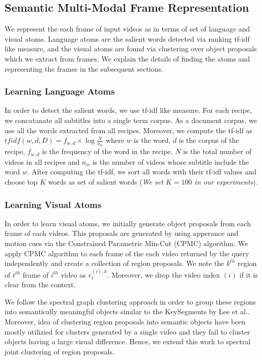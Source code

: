 \subsection{Semantic Multi-Modal Frame Representation}
We represent the each frame of input videos as in terms of set of language and visual atoms. Language atoms are the salient words detected via ranking tf-idf like measure, and the visual atoms are found via clustering over object proposals which we extract from frames. We explain the details of finding the atoms and representing the frames in the subsequent sections.
\subsubsection{Learning Language Atoms}
In order to detect the salient words, we use tf-idf like measure. For each recipe, we concatanate all subtitles into a single term corpus. As a document corpus, we use all the words extracted from all recipes. Moreover, we compute the tf-idf as $tfidf(w,d,D)=f_{w,d} \times \log \frac{N}{n_{w}}$ where $w$ is the word, $d$ is the corpus of the recipe, $f_{w,d}$ is the frequency of the word in the recipe, $N$ is the total number of videos in all recipes and $n_{w}$ is the number of videos whose subtitle include the word $w$. After computing the tf-idf, we sort all words with their tf-idf values and choose top $K$ words as set of salient words (\emph{We set $K=100$ in our experiments}).
\subsubsection{Learning Visual Atoms}
In order to learn visual atoms, we initially generate object proposals from each frame of each videos. This proposals are generated by using apperance and motion cues via the Constrained Parametric Min-Cut (CPMC) \cite{cpmc} algorithm. We apply CPMC algorithm to each frame of the each video returned by the query independently and create a collection of region proposals. We note the $k^{th}$ region of $t^{th}$ frame of $i^{th}$ video as $r^{(i),k}_t$. Moreover, we drop the video index $(i)$ if it is clear from the context.

We follow the spectral graph clustering approach in order to group these regions into semantically meaningful objects similar to the KeySegments by Lee et al.\cite{keysegments}. Moreover, idea of clustering region proposals into semantic objects have been mostly utilizied for clusters generated by a single video and they fail to cluster objects having a large visual difference. Hence, we extend this work to spectral joint clustering of region proposals.

